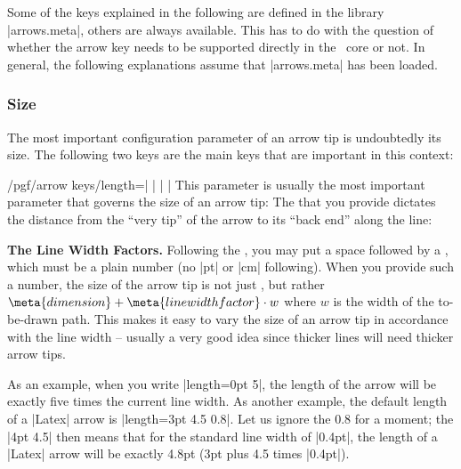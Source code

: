 Some of the keys explained in the following are defined in the library
|arrows.meta|, others are always available. This has to do with the
question of whether the arrow key needs to be supported directly in the
\pgfname\ core or not. In general, the following explanations assume
that |arrows.meta| has been loaded.


\subsubsection{Size}

The most important configuration parameter of an arrow tip is
undoubtedly its size. The following two keys are the main keys that
are important in this context:

\begin{key}{/pgf/arrow keys/length=| |%
    | |}
  \label{length-arrow-key}%
  This parameter is usually the most important parameter that governs
  the size of an arrow tip: The  that you provide
  dictates the distance from the ``very tip'' of the arrow to its
  ``back end'' along the line:
\begin{codeexample}[]
\end{codeexample}
\begin{codeexample}[]
\end{codeexample}
\begin{codeexample}[]
\end{codeexample}

  \medskip
  \noindent \textbf{The Line Width Factors.}
  Following the , you may put a space followed by a
  , which must be a plain number (no |pt| or
  |cm| following). When you provide such a number, the size of the
  arrow tip is not just , but rather $\meta{dimension}
  + \meta{line width factor}\cdot w$ where
  $w$ is the width of the to-be-drawn path. This
  makes it easy to vary the size of an arrow tip in accordance with
  the line width -- usually a very good idea since thicker lines will
  need thicker arrow tips. 

  As an example, when you write |length=0pt 5|, the length of the
  arrow will be exactly five times the current line width. As another
  example, the default length of a |Latex| arrow is
  |length=3pt 4.5 0.8|. Let us ignore the 0.8 for a moment; the
  |4pt 4.5| then means that for the standard line width of
  |0.4pt|, the length of a |Latex| arrow will be exactly 4.8pt (3pt
  plus 4.5 times |0.4pt|). 


\end{key}

